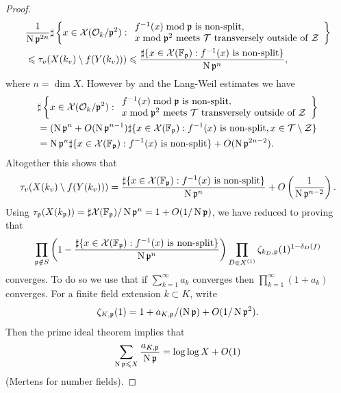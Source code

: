 \documentclass[a4paper,12pt,reqno]{amsart}
\numberwithin{equation}{section} \numberwithin{figure}{section}
\renewcommand{\O}{\mathcal{O}}
\newcommand\F{\mathbb{F}}
\renewcommand{\leq}{\leqslant}
\renewcommand{\#}{\sharp}
\newcommand{\fp}{\mathfrak{p}}
\theoremstyle{definition}
\numberwithin{lemma}{section}
\begin{document}
\begin{proof}
	\begin{align*}
	& \frac{1}{\Norm \fp^{2n}}\#\left\{ x \in \mathcal{X}(\O_k / \fp^2) : 
		\begin{array}{l}
			f^{-1}(x) \bmod \fp \text{ is non-split},  \\
			x \bmod \fp^2  \text{ meets } \mathcal{T} \text{ transversely 
			outside of } \mathcal{Z} 
		\end{array} \right\}  \\
	& \leq \tau_v(X(k_v) \setminus f(Y(k_v)))
	\leq \frac{\#\{ x \in \mathcal{X}(\F_\fp) : f^{-1}(x) \text{ is non-split} \}}{\Norm \fp^n},
	\end{align*}
	where $n = \dim X$. However by \cite[Prop.~2.3]{BL19} and the Lang-Weil
	estimates we have
	\begin{align*}
	& \#\left\{ x \in \mathcal{X}(\O_k / \fp^2) : 
		\begin{array}{l}
			f^{-1}(x) \bmod \fp \text{ is non-split},  \\
			x \bmod \fp^2  \text{ meets } \mathcal{T} \text{ transversely 
			outside of } \mathcal{Z} 
		\end{array} \right\} \\
	& = (\Norm \fp^n + O(\Norm \fp^{n-1})\#\{ x \in \mathcal{X}(\F_\fp) : f^{-1}(x) \text{ is non-split},
	x \in \mathcal{T} \setminus \mathcal{Z}\} \\
	& =  \Norm \fp^n \#\{ x \in \mathcal{X}(\F_\fp) : f^{-1}(x) \text{ is non-split} \}
	+ O(\Norm \fp^{2n - 2}).
	\end{align*}
	Altogether this shows that 
	$$\tau_v(X(k_v) \setminus f(Y(k_v)))
	=  \frac{\#\{ x \in \mathcal{X}(\F_\fp) : f^{-1}(x) \text{ is non-split} \}}{\Norm \fp^n}
	+ O\left(\frac{1}{\Norm \fp^{n-2}}\right).$$
	Using $\tau_\fp(X(k_\fp)) = \#\mathcal{X}(\F_\fp)/\Norm \fp^n = 1 + O(1/\Norm \fp)$, 
	we have reduced	to proving that
	\begin{equation} \label{eqn:Euler_split}
		\prod_{\fp \notin S} 
		\left(1 - \frac{\#\{ x \in \mathcal{X}(\F_\fp) : f^{-1}(x) \text{ is non-split} \}}{\Norm \fp^n} \right)
	 	\prod_{D \in X^{(1)}} \zeta_{k_D,\fp}(1)^{1-\delta_D(f)}
	\end{equation}
	converges. To do so we use that if $\sum_{k =1}^\infty a_k$ converges then
	$\prod_{k = 1}^\infty (1+a_k)$ converges. 
	For a finite field extension $k \subset K$,	write
	$$\zeta_{K,\fp}(1) = 1 + a_{K,\fp}/ (\Norm \fp) + O(1/ \Norm \fp^2).$$
	Then the prime ideal theorem implies that 
	$$\sum_{\Norm \fp \leq X} \frac{a_{K,\fp}}{\Norm \fp} = \log \log X + O(1)$$
	(Mertens for number fields).

\end{proof}
\end{document}
